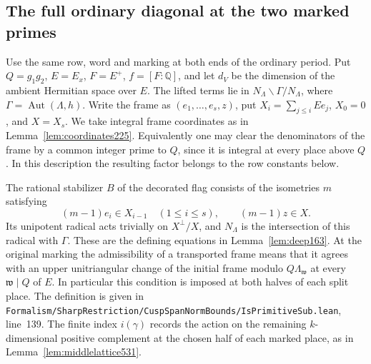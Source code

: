 \documentclass[a4paper,11pt]{article}
\theoremstyle{definition}
\theoremstyle{remark}
\newcommand{\srcloc}[2]{{\small\nolinkurl{#1.lean}}, line~#2}
\numberwithin{equation}{section}
\begin{document}
\subsection{The full ordinary diagonal at the two marked primes}
\label{sec:markeddiagonal540}

Use the same row, word and marking at both ends of the ordinary
period. Put \(Q=g_1g_2\), \(E=E_x\), \(F=E^+\),
\(f=[F:\mathbb Q]\), and let \(d_V\) be the dimension of the
ambient Hermitian space over \(E\). The lifted terms lie in
\(N_\Lambda\backslash\Gamma/N_\Lambda\), where
\(\Gamma=\operatorname{Aut}(\Lambda,h)\). Write the frame as
\((e_1,\ldots,e_s,z)\), put \(X_i=\sum_{j\le i}Ee_j\),
\(X_0=0\), and \(X=X_s\). We take integral frame coordinates as
in Lemma~\ref{lem:coordinates225}. Equivalently one may clear
the denominators of the frame by a common integer prime to \(Q\),
since it is integral at every place above \(Q\). In this
description the resulting factor belongs to the row constants below.

The rational stabilizer \(B\) of the decorated flag consists of
the isometries \(m\) satisfying
\[
       (m-1)e_i\in X_{i-1}\quad(1\le i\le s),\qquad
                         (m-1)z\in X .
\]
Its unipotent radical acts trivially on \(X^\perp/X\), and
\(N_\Lambda\) is the intersection of this radical with \(\Gamma\).
These are the defining equations in Lemma~\ref{lem:deep163}.
At the original marking the admissibility of a transported
frame means that it agrees with an upper unitriangular change
of the initial frame modulo \(Q\Lambda_{\mathfrak w}\) at
every \(\mathfrak w\mid Q\) of \(E\). In particular this
condition is imposed at both halves of each split place.
The definition is given in
\srcloc{Formalism/SharpRestriction/CuspSpanNormBounds/IsPrimitiveSub}{139}.
The finite index \(i(\gamma)\) records the action on the
remaining \(k\)-dimensional positive complement at the chosen
half of each marked place, as in Lemma~\ref{lem:middlelattice531}.
\end{document}
